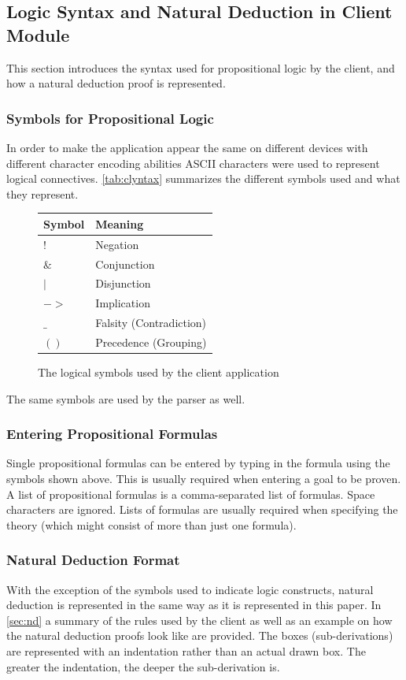 \documentclass[11pt,twoside,a4paper]{report}
\begin{document}
\subsection{Logic Syntax and Natural Deduction in Client Module}
\label{subsec:clyntax}
This section introduces the syntax used for propositional logic by the client, and how a natural deduction proof is represented.
\subsubsection{Symbols for Propositional Logic}
In order to make the application appear the same on different devices with different character encoding abilities ASCII characters were used to represent logical connectives. \autoref{tab:clyntax} summarizes the different symbols used and what they represent.

\begin{figure}[htp]
\begin{center}
\begin{tabular}{|l|l|}
\hline
Symbol & Meaning\\
\hline
$!$ & Negation\\
\hline
$\&$ & Conjunction\\
\hline
$|$ & Disjunction\\
\hline
$->$ & Implication\\
\hline
$\_$ & Falsity (Contradiction)\\
\hline
$()$ & Precedence (Grouping)\\
\hline
\end{tabular}
\end{center}
\caption{The logical symbols used by the client application \label{tab:clyntax}}
\end{figure}

The same symbols are used by the parser as well.

\subsubsection{Entering Propositional Formulas}
Single propositional formulas can be entered by typing in the formula using the symbols shown above. This is usually required when entering a goal to be proven. A list of propositional formulas is a comma-separated list of formulas. Space characters are ignored. Lists of formulas are usually required when specifying the theory (which might consist of more than just one formula).

\subsubsection{Natural Deduction Format}
With the exception of the symbols used to indicate logic constructs, natural deduction is represented in the same way as it is represented in this paper. In \autoref{sec:nd} a summary of the rules used by the client as well as an example on how the natural deduction proofs look like are provided. The boxes (sub-derivations) are represented with an indentation rather than an actual drawn box. The greater the indentation, the deeper the sub-derivation is.
\end{document}
